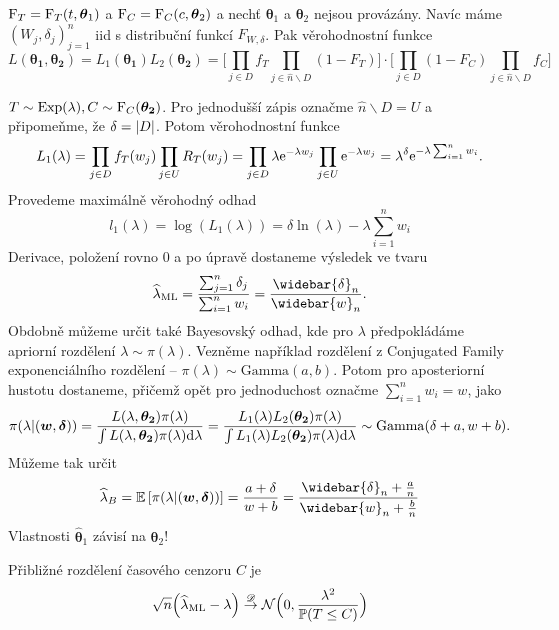     \begin{dusl}
        $\mathrm{F}_T = \mathrm{F}_T(t,\boldsymbol{\theta}_1)$ a $\mathrm{F}_C = \mathrm{F}_C(c,\boldsymbol{\theta}_2)$ a nechť $\boldsymbol{\theta}_1$ a $\boldsymbol{\theta}_2$ nejsou provázány. Navíc máme $(W_j,\delta_j)_{j=1}^n$ iid s distribuční funkcí $F_{W,\delta}$. Pak věrohodnostní funkce
        $$L(\boldsymbol{\theta_1}, \boldsymbol{\theta_2}) = L_1(\boldsymbol{\theta_1})L_2(\boldsymbol{\theta_2}) = \Big[\prod_{j\in D }f_T\prod_{j \in \widehat{n}\smallsetminus D}(1-F_T)\Big]\cdot\Big[\prod_{j\in D }(1-F_C)\prod_{j \in \widehat{n}\smallsetminus D}f_C\Big]$$
    \end{dusl}
    \begin{example}
        $T \sim \mathrm{Exp}(\lambda), C\sim  \mathrm{F}_C(\boldsymbol{\theta_2})$. Pro jednodušší zápis označme $\widehat{n}\smallsetminus D = U$ a připomeňme, že $\delta = \left|D\right|$.  Potom věrohodnostní funkce
        $$L_1(\lambda) =\prod_{j\in D }f_T(w_j)\prod_{j \in U}R_T(w_j) = \prod_{j\in D }\lambda\mathrm{e}^{-\lambda w_j}\prod_{j \in U}\mathrm{e}^{-\lambda w_j} = \lambda^{\delta}\mathrm{e}^{-\lambda\sum_{i=1}^n w_i}.$$ Provedeme maximálně věrohodný odhad
        $$l_1(\lambda) = \log(L_1(\lambda)) = \delta\ln(\lambda) - \lambda \sum_{i=1}^n w_i$$
        Derivace, položení rovno 0 a po úpravě dostaneme výsledek ve tvaru
        $$\widehat{\lambda}_\mathrm{ML} = \frac{\sum_{j=1}^n \delta_j}{\sum_{i=1}^n w_i} = \frac{\widebar{\delta}_n}{\widebar{w}_n}.$$
        Obdobně můžeme určit také Bayesovský odhad, kde pro $\lambda$ předpokládáme apriorní rozdělení $\lambda\sim \pi(\lambda)$. Vezněme například rozdělení z Conjugated Family exponenciálního rozdělení -- $\pi(\lambda) \sim \mathrm{Gamma}(a,b)$. Potom pro aposteriorní hustotu dostaneme, přičemž opět pro jednoduchost označme $\sum_{i=1}^n w_i  =w$, jako
        $$\pi(\lambda|(\boldsymbol{w},\boldsymbol{\delta})) = \frac{L(\lambda,\boldsymbol{\theta_2}) \pi(\lambda)}{\int L(\lambda,\boldsymbol{\theta_2}) \pi(\lambda)\mathrm{d} \lambda} = \frac{L_1(\lambda)L_2(\boldsymbol{\theta_2}) \pi(\lambda)}{\int L_1(\lambda)L_2(\boldsymbol{\theta_2}) \pi(\lambda)\mathrm{d} \lambda} \sim \mathrm{Gamma}(\delta+a,w+b).$$
        Můžeme tak určit
        $$\widehat{\lambda}_{B} = \EE{\pi(\lambda|(\boldsymbol{w},\boldsymbol{\delta}))} = \frac{a+\delta}{w+b} = \frac{\widebar{\delta}_n + \frac{a}{n}}{\widebar{w}_n + \frac{b}{n}}$$
        Vlastnosti $\widehat{\boldsymbol{\theta}}_1$ závisí na $\boldsymbol{\theta}_2$!
    \end{example}
    \begin{theorem}
        Přibližné rozdělení časového cenzoru $C$ je
        $$ \sqrt{n}\Big(\widehat{\lambda}_\mathrm{ML} - \lambda \Big) \stackrel{\mathscr{D}}{\to} \mathcal{N}\Big(0, \frac{\lambda^2}{\mathbb{P}(T \leq C)}\Big)$$
    \end{theorem}
